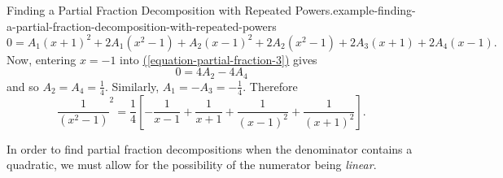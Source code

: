 \documentclass[10pt,]{book}
\numberwithin{equation}{section}
\begin{document}
\begin{example}{Finding a Partial Fraction Decomposition with Repeated Powers.}{example-finding-a-partial-fraction-decomposition-with-repeated-powers}
\begin{equation}
0 = A_{1}(x+1)^{2} + 2A_{1}(x^{2}-1) + A_{2}(x-1)^{2} + 2A_{2}(x^{2} - 1) + 2A_{3}(x+1) + 2A_{4}(x-1).\label{equation-partial-fraction-3}
\end{equation}
Now, entering \(x = -1\) into \hyperref[equation-partial-fraction-3]{(\ref{equation-partial-fraction-3})} gives%
\begin{equation*}
0 = 4A_{2} - 4A_{4}
\end{equation*}
and so \(A_{2} = A_{4} = \frac{1}{4}\). Similarly, \(A_{1} = - A_{3} = -\frac{1}{4}\). Therefore%
\begin{equation*}
\frac{1}{(x^{2} - 1)}^{2} = \frac{1}{4}\left[-\frac{1}{x-1} + \frac{1}{x+1} + \frac{1}{(x-1)^{2}} + \frac{1}{(x+1)^{2}}\right].
\end{equation*}
%
\end{example}
\hypertarget{p-559}{}%
In order to find partial fraction decompositions when the denominator contains a quadratic, we must allow for the possibility of the numerator being \emph{linear}.%
\end{document}
